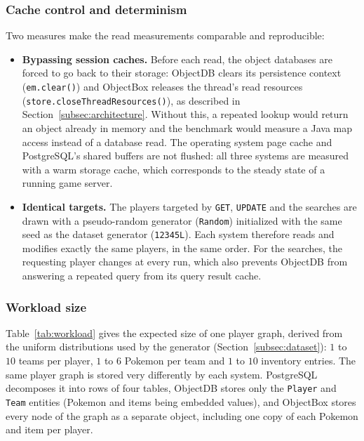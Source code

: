 \documentclass{article}
\begin{document}
\subsubsection{Cache control and determinism}
Two measures make the read measurements comparable and reproducible:
\begin{itemize}
    \item \textbf{Bypassing session caches.} Before each read, the object databases are forced to go back to their storage: ObjectDB clears its persistence context (\texttt{em.clear()}) and ObjectBox releases the thread's read resources (\texttt{store.closeThreadResources()}), as described in Section~\ref{subsec:architecture}. Without this, a repeated lookup would return an object already in memory and the benchmark would measure a Java map access instead of a database read. The operating system page cache and PostgreSQL's shared buffers are not flushed: all three systems are measured with a warm storage cache, which corresponds to the steady state of a running game server.
    \item \textbf{Identical targets.} The players targeted by \texttt{GET}, \texttt{UPDATE} and the searches are drawn with a pseudo-random generator (\texttt{Random}) initialized with the same seed as the dataset generator (\texttt{12345L}). Each system therefore reads and modifies exactly the same players, in the same order. For the searches, the requesting player changes at every run, which also prevents ObjectDB from answering a repeated query from its query result cache.
\end{itemize}

\subsubsection{Workload size}
Table~\ref{tab:workload} gives the expected size of one player graph, derived from the uniform distributions used by the generator (Section~\ref{subsec:dataset}): $1$ to $10$ teams per player, $1$ to $6$ Pokemon per team and $1$ to $10$ inventory entries. The same player graph is stored very differently by each system. PostgreSQL decomposes it into rows of four tables, ObjectDB stores only the \texttt{Player} and \texttt{Team} entities (Pokemon and items being embedded values), and ObjectBox stores every node of the graph as a separate object, including one copy of each Pokemon and item per player.
\end{document}
